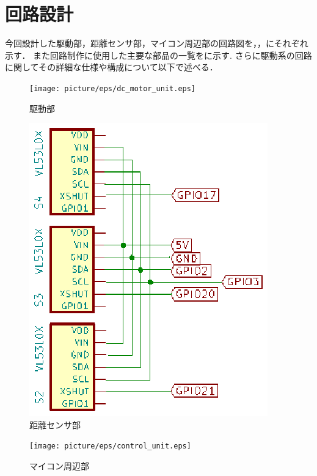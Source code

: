 \section{回路設計}
今回設計した駆動部，距離センサ部，マイコン周辺部の回路図を，，にそれぞれ示す．
また回路制作に使用した主要な部品の一覧をに示す.
さらに駆動系の回路に関してその詳細な仕様や構成について以下で述べる．

\begin{figure}[h]
\centering
\texttt{[image: picture/eps/dc\_motor\_unit.eps]}
\caption{駆動部}
\label{fig::dc_motor_unit}
\end{figure}

\begin{figure}[b]
\centering
\includegraphics[scale=1]{picture/eps/sensor_unit.eps}
\caption{距離センサ部}
\label{fig::sensor_unit}
\end{figure}

\begin{figure}[h]
\centering
\texttt{[image: picture/eps/control\_unit.eps]}
\caption{マイコン周辺部}
\label{fig::control_unit}
\end{figure}

\clearpage

